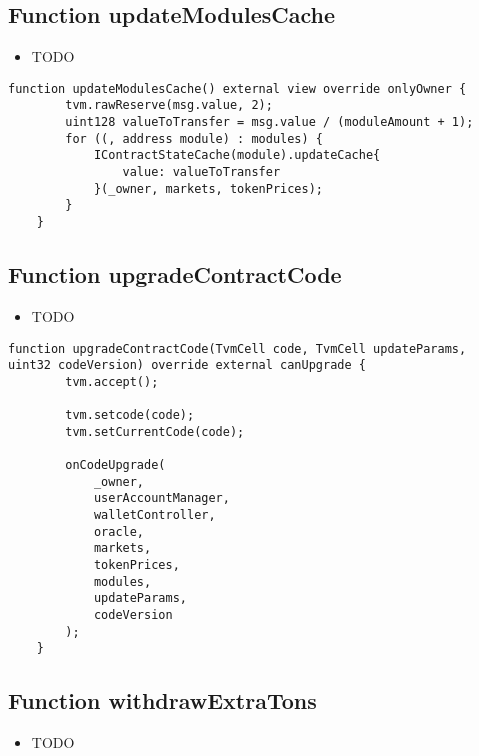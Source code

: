 \subsection{Function updateModulesCache}

\noindent\begin{itemize}
\item TODO
\end{itemize}

\begin{lstlisting}[firstnumber=203]
    function updateModulesCache() external view override onlyOwner {
        tvm.rawReserve(msg.value, 2);
        uint128 valueToTransfer = msg.value / (moduleAmount + 1);
        for ((, address module) : modules) {
            IContractStateCache(module).updateCache{
                value: valueToTransfer
            }(_owner, markets, tokenPrices);
        }
    }
\end{lstlisting}

\subsection{Function upgradeContractCode}

\noindent\begin{itemize}
\item TODO
\end{itemize}

\begin{lstlisting}[firstnumber=44]
    function upgradeContractCode(TvmCell code, TvmCell updateParams, uint32 codeVersion) override external canUpgrade {
        tvm.accept();

        tvm.setcode(code);
        tvm.setCurrentCode(code);

        onCodeUpgrade(
            _owner,
            userAccountManager,
            walletController,
            oracle,
            markets,
            tokenPrices,
            modules,
            updateParams,
            codeVersion
        );
    }
\end{lstlisting}

\subsection{Function withdrawExtraTons}

\noindent\begin{itemize}
\item TODO
\end{itemize}

